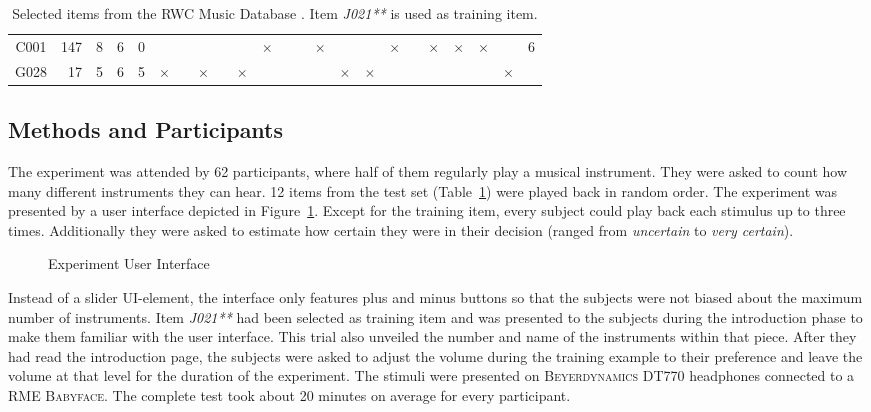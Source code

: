 \begin{table}[h]
\begin{tabular}{c|r@{.}l|r@{.}l|l|l|l|l|l|l|l|l|l|l|l|l|l|l|l|l|l|l}
C001 & 147&8 & 6&0 & & & & & &\cellcolor[gray]{0.9} $\times$& & &\cellcolor[gray]{0.9} $\times$& & &\cellcolor[gray]{0.9} $\times$& &\cellcolor[gray]{0.9} $\times$&\cellcolor[gray]{0.9} $\times$&\cellcolor[gray]{0.9} $\times$& & \multirow{2}{*}{6} \\
G028 & 17&5 	& 6&5 &\cellcolor[gray]{0.9} $\times$& &\cellcolor[gray]{0.9} $\times$& &\cellcolor[gray]{0.9} $\times$& & & & &\cellcolor[gray]{0.9} $\times$&\cellcolor[gray]{0.9} $\times$& & & & & &\cellcolor[gray]{0.9} $\times$ & \\ \hline
\bottomrule[1.5pt]

\end{tabular}
\caption{Selected items from the RWC Music Database \cite{rwc}. Item \emph{J021**} is used as training item.}
\label{tab:items}
\end{table}

\subsection{Methods and Participants}

The experiment was attended by 62 participants, where half of them regularly play a musical instrument. They were asked to count how many different instruments they can hear. 12 items from the test set (Table~\ref{tab:items}) were played back in random order. The experiment was presented by a user interface depicted in Figure~\ref{fig:experiment_ui}. Except for the training item, every subject could play back each stimulus up to three times. Additionally they were asked to estimate how certain they were in their decision (ranged from \emph{uncertain} to \emph{very certain}).
\begin{figure}[h]
	\centering
	\caption{Experiment User Interface}
	\label{fig:experiment_ui}
\end{figure}
Instead of a slider UI-element, the interface only features plus and minus buttons so that the subjects were not biased about the maximum number of instruments. Item \emph{J021**} had been selected as training item and was presented to the subjects during the introduction phase to make them familiar with the user interface. This trial also unveiled the number and name of the instruments within that piece. After they had read the introduction page, the subjects were asked to adjust the volume during the training example to their preference and leave the volume at that level for the duration of the experiment. The stimuli were presented on \textsc{Beyerdynamics DT770} headphones connected to a \textsc{RME Babyface}. The complete test took about 20 minutes on average for every participant.
\vspace{-1.0em}
